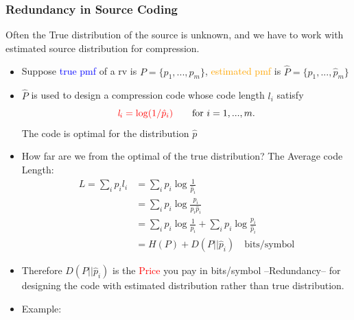 \documentclass[24pt]{article}
\begin{document}
\subsubsection{Redundancy in Source Coding}
Often the \textcolor{blue1}{True distribution} of the source is unknown, and we have to work with estimated source distribution for compression.
\begin{itemize}
\item Suppose \textcolor{blue}{true pmf} of a rv is $P = \{ p_1,...,p_m\}$, \textcolor{orange}{estimated pmf} is $\hat{P} = \{ \hat{p}_1,...,\hat{p}_m\}$
\item $\hat{P}$ is used to design a compression code whose code length $\mathit{l}_i$ satisfy
\[
\textcolor{red}{ \mathit{l}_i = \log(1/\hat{p}_i) }\qquad \textrm{for } i=1,...,m.
\]
The code is optimal for the distribution $\hat{p}$
\item How far are we from the optimal of the \textcolor{blue1}{true distribution}?
The Average code Length:
\begin{align*}
L = \sum_ip_i\mathit{l}_i & = \sum_{i}p_i \log \frac{1}{\hat{p}_i} \\
& = \sum_{i}p_i \log\frac{p_i}{p_i\hat{p}_i} \\
& = \sum_{i}p_i \log\frac{1}{p_i} + \sum_{i}p_i \log\frac{p_i}{\hat{p}_i} \\
& = H(P) + D(P||\hat{p}_i) \quad \textrm{bits/symbol}

\end{align*}
\item Therefore  $D(P||\hat{p}_i)$ is the \textcolor{red}{Price} you pay in bits/symbol --Redundancy-- for designing the code with estimated distribution rather than true distribution.

\item Example:  

\end{itemize}
\end{document}
